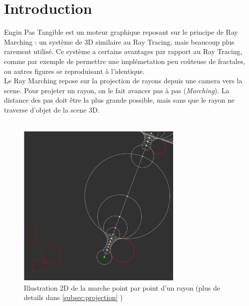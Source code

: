 \section{Introduction}

    Engin Pas Tangible est un moteur graphique reposant sur le principe de Ray Marching : un système de 3D similaire au Ray Tracing, mais beaucoup plus rarement utilisé. Ce système a certains avantages par rapport au Ray Tracing, comme par exemple de permettre une implémetation peu coûteuse de fractales, ou autres figures se reproduisant à l'identique. \\
    Le Ray Marching repose sur la projection de rayons depuis une camera vers la scene. Pour projeter un rayon, on le fait avancer pas à pas (\emph{Marching}). La distance des pas doit être la plus grande possible, mais sans que le rayon ne traverse d'objet de la scene 3D.
\\
\\
\begin{figure}[h]
    \centering
    \includegraphics[width=8cm]{images/marching.png}
    \caption{Illustration 2D de la marche point par point d'un rayon (plus de details dans \ref{subsec:projection} )}
    \label{fig:my_label}
\end{figure}
